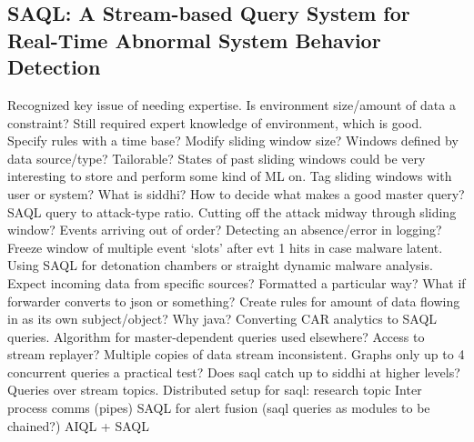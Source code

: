 \documentclass[conference]{IEEEtran}
\begin{document}
\subsection{SAQL: A Stream-based Query System for Real-Time Abnormal System Behavior Detection\cite{gao_saql:_2018}}
Recognized key issue of needing expertise.
Is environment size/amount of data a constraint?
Still required expert knowledge of environment, which is good.
Specify rules with a time base?
Modify sliding window size?
Windows defined by data source/type? Tailorable?
States of past sliding windows could be very interesting to store and perform some kind of ML on.
Tag sliding windows with user or system?
What is siddhi?
How to decide what makes a good master query?
SAQL query to attack-type ratio.
Cutting off the attack midway through sliding window?
Events arriving out of order?
Detecting an absence/error in logging?
Freeze window of multiple event ‘slots’ after evt 1 hits in case malware latent.
Using SAQL for detonation chambers or straight dynamic malware analysis.
Expect incoming data from specific sources? Formatted a particular way? What if forwarder converts to json or something?
Create rules for amount of data flowing in as its own subject/object?
Why java?
Converting CAR analytics to SAQL queries.
Algorithm for master-dependent queries used elsewhere?
Access to stream replayer?
Multiple copies of data stream inconsistent.
Graphs only up to 4 concurrent queries a practical test? Does saql catch up to siddhi at higher levels?
Queries over stream topics.
Distributed setup for saql: research topic
Inter process comms (pipes)
SAQL for alert fusion (saql queries as modules to be chained?)
AIQL + SAQL
\end{document}
